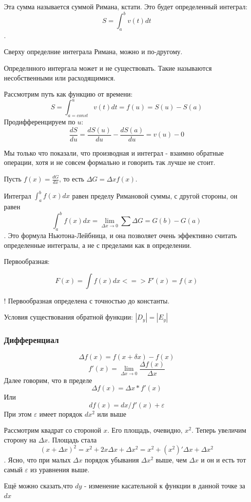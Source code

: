 \documentclass{article}
\begin{document}
Эта сумма называется суммой Римана, кстати. Это будет определенный интеграл: 
$$S = \int^b_av(t)dt$$.

Сверху определние интеграла Римана, можно и по-другому.

Определнного интергала может и не существовать. Такие называются несобственными или расходящимися.

Рассмотрим путь как функцию от времени:
 $$S = \int^u_{a=const} v(t)dt = f(u) = S(u) - S(a)$$ 
Продифференцируем по $u$:
$$\frac{dS}{du} = \frac{dS(u)}{du} - \frac{dS(a)}{du} =  v(u) - 0$$

Мы только что показали, что производная и интеграл - взаимно обратные операции, хотя и не совсем формально и говорить так лучше не стоит.

Пусть $f(x) = \frac{dG}{dx}$, то есть $\Delta G = \Delta x f(x)$. 

Интеграл $\int^{b}_af(x)dx$ равен пределу Римановой суммы, с другой стороны, он равен $$\int^{b}_af(x)dx = \lim_{\Delta x \to 0}\sum\Delta G = G(b) - G(a)$$.
Это формула Ньютона-Лейбница, и она позволяет очень эффективно считать определенные интегралы, а не с пределами как в определении. 
 
Первообразная:


$$F(x) = \int f(x) dx <=> F'(x) = f(x)$$

! Первообразная определена с точностью до константы.

Условия существования обратной функции: $|D_y|=|E_y|$


\subsubsection{Дифференциал}
$$\Delta f(x) = f(x+\delta x) - f(x)$$
$$f'(x) =\lim _{\Delta x \to 0} \frac{\Delta f(x)}{\Delta x}$$
Далее говорим, что в пределе
$$\Delta f(x) = \Delta x * f'(x)$$
Или
$$df(x) = dx/f'(x) + \varepsilon$$
При этом $\varepsilon$ имеет порядок $dx^2$ или выше

Рассмотрим квадрат со стороной $x$. Его площадь, очевидно, $x^2$. Теперь увеличим сторону на $\Delta x$. Площадь стала $$(x+\Delta x)^2 = x^2 + 2x\Delta x + \Delta x^2 = x^2 + (x^2)'\Delta x + \Delta x^2$$. Ясно, что при малых $\Delta x$ порядок убывания $\Delta x^2$ выше, чем $\Delta x$ и он и есть тот самый $\varepsilon$ из уравнения выше.  

Ещё можно сказать,что $dy$ - изменение касательной к функции в данной точке за $dx$
\end{document}
